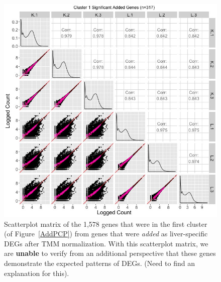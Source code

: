 \documentclass{article}
\begin{document}
\null
\begin{figure}[t!]
\centerline{\includegraphics[width=1\columnwidth]{../Bioinformatics/Pictures/liverKidney/Clustering_data_FDR_001_TMMvRaw_Add/K_L_Sig_SM_Add_8_1.jpg}}
\caption{Scatterplot matrix of the 1,578 genes that were in the first cluster (of Figure~\ref{AddPCP}) from genes that were \textit{added} as liver-specific DEGs after TMM normalization. With this scatterplot matrix, we are \textbf{unable} to verify from an additional perspective that these genes demonstrate the expected patterns of DEGs. (Need to find an explanation for this).
\label{AddSM}}
\end{figure}
\end{document}
